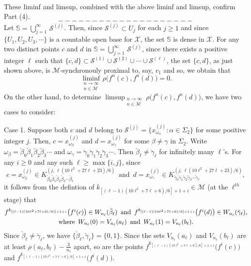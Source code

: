 \documentclass[12pt]{article}
\newcommand{\al}{\alpha}
\newcommand{\be}{\beta}
\begin{document}
\indent These liminf and limsup, combined with the above liminf and limsup, confirm Part (4).
$$--------------------$$
\indent Let $\mathbb S = \bigcup_{j=1}^\infty \, \mathcal S^{(j)}$.  Then, since $\mathcal S^{(j)} \subset U_j$ for each $j \ge 1$ and since $\{U_1, U_2, U_3, \cdots \}$ is a countable open base for $\mathcal X$, the set $\mathbb S$ is dense in $\mathcal X$.  For any two distinct points $c$ and $d$ in $\mathbb S = \bigcup_{j=1}^\infty \, \mathcal S^{(j)}$, since there exists a positive integer $\ell$ such that $\{ c, d \} \subset \mathcal S^{(1)} \cup \mathcal S^{(2)} \cup \cdots \cup \mathcal S^{(\ell)}$, the set $\{ c, d \}$, as just shown above, is $\mathcal M$-synchronouly proximal to, say, $v_1$ and so, we obtain that 
$$
\liminf_{\substack{n \to \infty \\ n \in \mathcal M}} \rho\big(f^n(c), f^n(d)\big) = 0.
$$
\indent On the other hand, to determine $\limsup_{\substack{n \to \infty \\ n \in \mathcal M}} \rho\big(f^n(c), f^n(d)\big)$, we have two cases to consider:

Case 1. Suppose both $c$ and $d$ belong to $\mathcal S^{(j)} = \{ x_{\omega_\al}^{(j)}: \al \in \Sigma_2 \}$ for some positive integer $j$. Then, $c = x_{\omega_{\be}}^{(j)}$ and $d = x_{\omega_{\gamma}}^{(j)}$ for some $\be \ne \gamma$ in $\Sigma_2$.  Write $\omega_{\be} = \breve \be_0 \breve \be_1 \breve \be_2 \breve \be_3 \cdots$ and $\omega_{\gamma} = \breve \gamma_0 \breve \gamma_1 \breve \gamma_2 \breve \gamma_3 \cdots$.  Then $\breve \be_\ell \ne \breve \gamma_\ell$ for infinitely many $\ell$'s.  For any $i \ge 0$ and any such $\ell \ge \max \{ i,j \}$, since 
$$
c = x_{\omega_{\be}}^{(j)} \in K_{\breve \be_0 \breve \be_1 \breve \be_2 \breve \be_3 \cdots\breve \be_\ell}^{(j, \, \ell(10\ell^2+27\ell+23)/6)} \,\,\, \text{and} \,\,\, d = x_{\omega_{\gamma}}^{(j)} \in K_{\breve \gamma_0 \breve \gamma_1 \breve \gamma_2 \breve \gamma_3 \cdots\breve \gamma_\ell}^{(j, \, \ell(10\ell^2+27\ell+23)/6)},
$$
it follows from the defintion of $k_{[(\ell-1)(10\ell^2+7\ell+6)/6]+1+i} \in \mathcal M$ (at the $\ell^{th}$ stage) that 
\begin{multline*}
$$
f^{k_{[(\ell-1)(10\ell^2+7\ell+6)/6)]+1+i}}\big(f^i(c)\big) \in W_{n_\ell}(\breve \be_\ell) \,\,\, \text{and} \,\,\, f^{k_{[(\ell-1)(10\ell^2+7\ell+6)/6]+1+i}}\big(f^i(d)\big) \in W_{n_\ell}(\breve \gamma_\ell), \\ \text{where} \,\,\, W_{n_\ell}(0) = V_{n_\ell}(a_\ell) \,\,\, \text{and} \,\,\,  W_{n_\ell}(1) = V_{n_\ell}(b_\ell).
$$
\end{multline*}
Since $\breve \be_\ell \ne \breve \gamma_\ell$, we have $\{ \breve \be_\ell, \breve \gamma_\ell \} = \{ 0, 1 \}$.  Since the sets $V_{n_\ell}(a_\ell)$ and $V_{n_\ell}(b_\ell)$ are at least $\rho(a_\ell, b_\ell) - \frac 3{n_\ell}$ apart, so are the points $f^{k_{[(\ell-1)(10\ell^2+7\ell+6)/6]+1+i}}\big(f^i(c)\big)$ and $f^{k_{[(\ell-1)(10\ell^2+7\ell+6)/6]+1+i}}\big(f^i(d)\big)$.  
\end{document}
